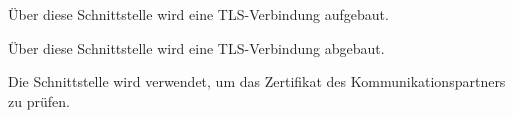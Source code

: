 





Über diese Schnittstelle wird eine TLS-Verbindung aufgebaut.


Über diese Schnittstelle wird eine TLS-Verbindung abgebaut.


Die Schnittstelle  wird verwendet, um das
Zertifikat des Kommunikationspartners zu prüfen.

